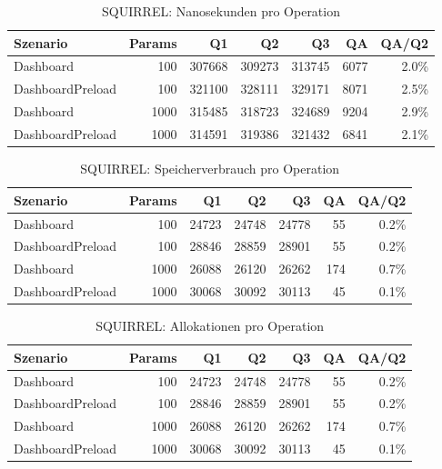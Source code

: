 
\begin{table}[ht]
\caption{SQUIRREL: Nanosekunden pro Operation}
\begin{tabular}{lrrrrrr}
\toprule
Szenario & Params & Q1 & Q2 & Q3 & QA & QA/Q2 \\
\midrule
	Dashboard & 100 & 307668 & 309273 & 313745 & 6077 & 2.0\% \\
	DashboardPreload & 100 & 321100 & 328111 & 329171 & 8071 & 2.5\% \\
	Dashboard & 1000 & 315485 & 318723 & 324689 & 9204 & 2.9\% \\
	DashboardPreload & 1000 & 314591 & 319386 & 321432 & 6841 & 2.1\% \\
\bottomrule
\end{tabular}
\label{tab:benchmark_squirrel_nsperop}
\end{table}
	
\begin{table}[ht]
\caption{SQUIRREL: Speicherverbrauch pro Operation}
\begin{tabular}{lrrrrrr}
\toprule
Szenario & Params & Q1 & Q2 & Q3 & QA & QA/Q2 \\
\midrule
	Dashboard & 100 & 24723 & 24748 & 24778 & 55 & 0.2\% \\
	DashboardPreload & 100 & 28846 & 28859 & 28901 & 55 & 0.2\% \\
	Dashboard & 1000 & 26088 & 26120 & 26262 & 174 & 0.7\% \\
	DashboardPreload & 1000 & 30068 & 30092 & 30113 & 45 & 0.1\% \\
\bottomrule
\end{tabular}
\label{tab:benchmark_squirrel_bytesperop}
\end{table}
	
\begin{table}[ht]
\caption{SQUIRREL: Allokationen pro Operation}
\begin{tabular}{lrrrrrr}
\toprule
Szenario & Params & Q1 & Q2 & Q3 & QA & QA/Q2 \\
\midrule
	Dashboard & 100 & 24723 & 24748 & 24778 & 55 & 0.2\% \\
	DashboardPreload & 100 & 28846 & 28859 & 28901 & 55 & 0.2\% \\
	Dashboard & 1000 & 26088 & 26120 & 26262 & 174 & 0.7\% \\
	DashboardPreload & 1000 & 30068 & 30092 & 30113 & 45 & 0.1\% \\
\bottomrule
\end{tabular}
\label{tab:benchmark_squirrel_allocsperop}
\end{table}
	